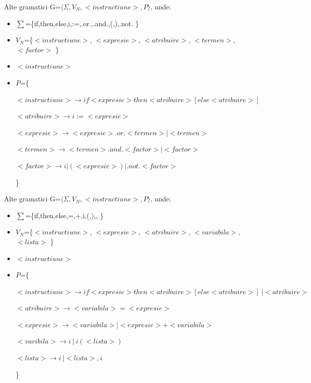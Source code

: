 \documentclass[pdf]{beamer}
\begin{document}
\begin{frame}{Alte gramatici}
G=$\langle \Sigma, V_N, <instructiune>, P \rangle$, unde:

\begin{itemize}
\item
$\sum$=\{if,then,else,i,:=,.or.,.and.,(,),.not. \}
\item
$V_N$=\{$<instructiune>$, $<expresie>$, $<atribuire>$, $<termen>$, $<factor>$ \}
\item
$<instructiune>$
\item
$P$=\{

$<instructiune> \rightarrow if <expresie> then <atribuire> [else < atribuire> ]  $

$<atribuire> \rightarrow i := <expresie > $

$<expresie> \rightarrow <expresie> .or. <termen> | <termen> $

$<termen> \rightarrow <termen> .and. <factor> | <factor>$

$<factor> \rightarrow i | (<expresie>) | .not. <factor>$

\}
\end{itemize}

\end{frame}



\begin{frame}{Alte gramatici}
G=$\langle \Sigma, V_N, <instructiune>, P \rangle$, unde:

\begin{itemize}
\item
$\sum$=\{if,then,else,=,+,i,(,),, \}
\item
$V_N$=\{$<instructiune>$, $<expresie>$, $<atribuire>$, $<variabila>$, $<lista>$ \}
\item
$<instructiune>$
\item
$P$=\{

$<instructiune> \rightarrow if <expresie> then <atribuire> [else < atribuire > ] \ | <atribuire>$

$<atribuire> \rightarrow <variabila> = <expresie > $

$<expresie> \rightarrow <variabila> | <expresie> + <variabila> $

$<varibila> \rightarrow i \ | \ i (<lista>)$

$<lista> \rightarrow i \ | <lista> , i $

\}
\end{itemize}

\end{frame}
\end{document}
